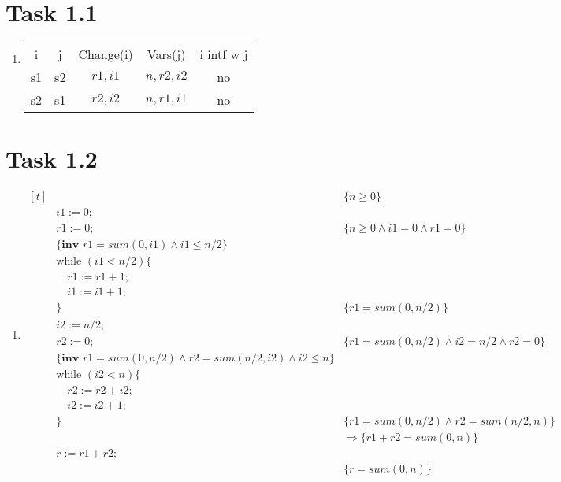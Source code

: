 \documentclass{article}
\author{\hmwkAuthorName}
\date{}
\newcommand{\answer}{\item[]} %
\begin{document}
	
	
	\section{Task 1.1}
	
		\begin{enumerate}[label={(\alph*)}]
			
			\answer
			\begin{tabular}{c c c c c}
				i & j & Change(i) & Vars(j) & i intf w j \\
				s1 & s2 & $r1, i1$ & $n, r2, i2$ & no \\
				s2 & s1 & $r2, i2$ & $n, r1, i1$ & no \\ 
			\end{tabular}
			
		\end{enumerate}
	
	\section{Task 1.2}
	
		\begin{enumerate}[label={(\alph*)}]
			
			\answer
			$\begin{aligned}[t]
				&\qquad \qquad \qquad \qquad &\{n \geq 0\} \\
				&i1 := 0; \\
				&r1 := 0; &\{n \geq 0 \land i1 = 0 \land r1 = 0\} \\
				&\{\textbf{inv } r1 = sum(0, i1) \land i1 \leq n / 2 \} \\
				&\text{while } (i1 < n / 2) \{ \\
				&\quad r1 := r1 + 1; \\
				&\quad i1 := i1 + 1; \\
				&\} &\{r1 = sum(0, n/2)\} \\
				&i2 := n / 2; \\
				&r2 := 0; &\{r1 = sum(0, n/2) \land i2 = n / 2 \land r2 = 0\} \\
				&\{\textbf{inv } r1 = sum(0, n/2) \land r2 = sum(n / 2, i2) \land i2 \leq n\} \\
				&\text{while } (i2 < n) \{ \\
				&\quad r2 := r2 + i2; \\
				&\quad i2 := i2 + 1; \\
				&\} &\{r1 = sum(0, n/2) \land r2 = sum(n/2, n)\} \\
				& &\Rightarrow \{r1 + r2 = sum(0, n)\} \\
				&r := r1 + r2; \\
				& &\{r = sum(0, n)\} \\
			\end{aligned}$
			
		\end{enumerate}
\end{document}
